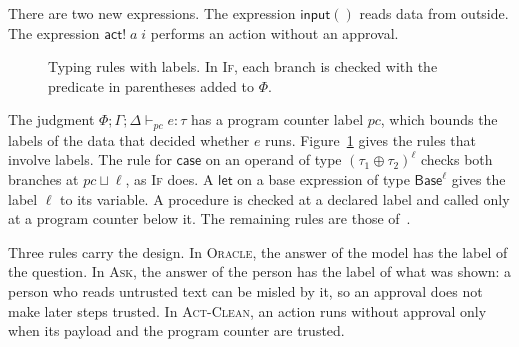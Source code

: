 \documentclass[acmsmall,nonacm,screen]{acmart}
\newcommand{\kw}[1]{\mathsf{#1}}
\newcommand{\Ok}[2]{\kw{Ok}(#1, #2)}
\newcommand{\ret}{\kw{ret}}
\newcommand{\ask}[2]{\kw{ask}\;#1\;(#2)}
\newcommand{\act}[3]{\kw{act}\;#1\;#2\;#3}
\newcommand{\actc}[2]{\kw{act!}\;#1\;#2}
\newcommand{\orc}[1]{\kw{oracle}(#1)}
\newcommand{\inp}{\kw{input}()}
\newcommand{\judg}[4]{\Phi; \Gamma; #1 \vdash_{#2} #3 : #4}
\newcommand{\Base}{\kw{Base}}
\newcommand{\T}{\kw{T}}
\newcommand{\U}{\kw{U}}
\newcommand{\lab}{\mathrm{lab}}
\begin{document}
There are two new expressions. The expression $\inp$ reads data from outside. The expression
$\actc{a}{i}$ performs an action without an approval.

\begin{figure}
\caption{Typing rules with labels. In \textsc{If}, each branch is checked with the predicate in
parentheses added to $\Phi$.}
\label{fig:rules}
\end{figure}

The judgment $\judg{\Delta}{pc}{e}{\tau}$ has a program counter label $pc$, which bounds the
labels of the data that decided whether $e$ runs. Figure~\ref{fig:rules} gives the rules that
involve labels. The rule for $\kw{case}$ on an operand of type $(\tau_1 \oplus \tau_2)^\ell$
checks both branches at $pc \sqcup \ell$, as \textsc{If} does. A $\kw{let}$ on a base
expression of type $\Base^\ell$ gives the label $\ell$ to its variable. A procedure is checked
at a declared label and called only at a program counter below it. The remaining rules are those
of~\citet{tpp4}.

Three rules carry the design. In \textsc{Oracle}, the answer of the model has the label of the
question. In \textsc{Ask}, the answer of the person has the label of what was shown: a person
who reads untrusted text can be misled by it, so an approval does not make later steps trusted.
In \textsc{Act-Clean}, an action runs without approval only when its payload and the program
counter are trusted.
\end{document}
